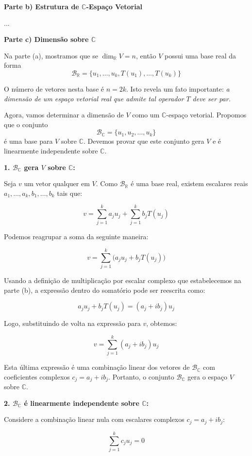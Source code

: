 \textbf{Parte b) Estrutura de $\mathbb{C}$-Espaço Vetorial}

...

\textbf{Parte c) Dimensão sobre $\mathbb{C}$}

Na parte (a), mostramos que se $\dim_{\mathbb{R}} V=n$, então $V$ possui uma base real da forma
\[
\mathcal{B}_{\mathbb{R}}=\{u_1,\ldots,u_k,T(u_1),\ldots,T(u_k)\}
\]

O número de vetores nesta base é $n=2k$. Isto revela um fato importante: \textit{a dimensão de um
espaço vetorial real que admite tal operador $T$ deve ser par.}

Agora, vamos determinar a dimensão de $V$ como um $\mathbb{C}$-espaço vetorial. Propomos que o conjunto
\[
\mathcal{B}_{\mathbb{C}}=\{u_1,u_2,\ldots,u_k\}
\]
é uma base para $V$ sobre $\mathbb{C}$. Devemos provar que este conjunto gera $V$ e é linearmente
independente sobre $\mathbb{C}$.

\textbf{1. $\mathcal{B}_{\mathbb{C}}$ gera $V$ sobre $\mathbb{C}$:}

Seja $v$ um vetor qualquer em $V$. Como $\mathcal{B}_{\mathbb{R}}$ é uma base real, existem escalares reais 
$a_{1}, \ldots, a_{k}, b_{1}, \ldots, b_{k}$ tais que:

\[
v = \sum_{j=1}^{k} a_{j}u_{j} + \sum_{j=1}^{k} b_{j}T(u_{j})
\]

Podemos reagrupar a soma da seguinte maneira:

\[
v = \sum_{j=1}^{k} \big(a_{j}u_{j} + b_{j}T(u_{j})\big)
\]

Usando a definição de multiplicação por escalar complexo que estabelecemos na parte (b), a expressão dentro do somatório pode ser reescrita como:

\[
a_{j}u_{j} + b_{j}T(u_{j}) = (a_{j} + ib_{j})u_{j}
\]

Logo, substituindo de volta na expressão para $v$, obtemos:

\[
v = \sum_{j=1}^{k} (a_{j} + ib_{j})u_{j}
\]

Esta última expressão é uma combinação linear dos vetores de $\mathcal{B}_{\mathbb{C}}$ com coeficientes complexos 
$c_{j} = a_{j} + ib_{j}$. Portanto, o conjunto $\mathcal{B}_{\mathbb{C}}$ gera o espaço $V$ sobre $\mathbb{C}$.

\textbf{2. $\mathcal{B}_{\mathbb{C}}$ é linearmente independente sobre $\mathbb{C}$:}

Considere a combinação linear nula com escalares complexos $c_{j} = a_{j} + ib_{j}$:

\[
\sum_{j=1}^{k} c_{j}u_{j} = 0
\]

